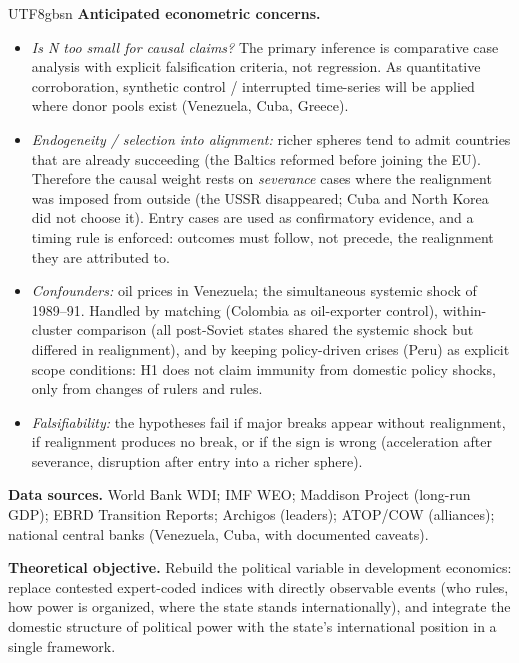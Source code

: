 \documentclass[10pt]{article}
\begin{document}
\begin{CJK}{UTF8}{gbsn}
\noindent\textbf{Anticipated econometric concerns.}
\begin{itemize}
    \item \emph{Is N too small for causal claims?} The primary inference is comparative case analysis with explicit falsification criteria, not regression. As quantitative corroboration, synthetic control / interrupted time-series will be applied where donor pools exist (Venezuela, Cuba, Greece).
    \item \emph{Endogeneity / selection into alignment:} richer spheres tend to admit countries that are already succeeding (the Baltics reformed before joining the EU). Therefore the causal weight rests on \emph{severance} cases where the realignment was imposed from outside (the USSR disappeared; Cuba and North Korea did not choose it). Entry cases are used as confirmatory evidence, and a timing rule is enforced: outcomes must follow, not precede, the realignment they are attributed to.
    \item \emph{Confounders:} oil prices in Venezuela; the simultaneous systemic shock of 1989--91. Handled by matching (Colombia as oil-exporter control), within-cluster comparison (all post-Soviet states shared the systemic shock but differed in realignment), and by keeping policy-driven crises (Peru) as explicit scope conditions: H1 does not claim immunity from domestic policy shocks, only from changes of rulers and rules.
    \item \emph{Falsifiability:} the hypotheses fail if major breaks appear without realignment, if realignment produces no break, or if the sign is wrong (acceleration after severance, disruption after entry into a richer sphere).
\end{itemize}

\noindent\textbf{Data sources.} World Bank WDI; IMF WEO; Maddison Project (long-run GDP); EBRD Transition Reports; Archigos (leaders); ATOP/COW (alliances); national central banks (Venezuela, Cuba, with documented caveats).

\newpage


\vspace{6pt}
\noindent\textbf{Theoretical objective.} Rebuild the political variable in development economics: replace contested expert-coded indices with directly observable events (who rules, how power is organized, where the state stands internationally), and integrate the domestic structure of political power with the state's international position in a single framework.


\end{CJK}
\end{document}
